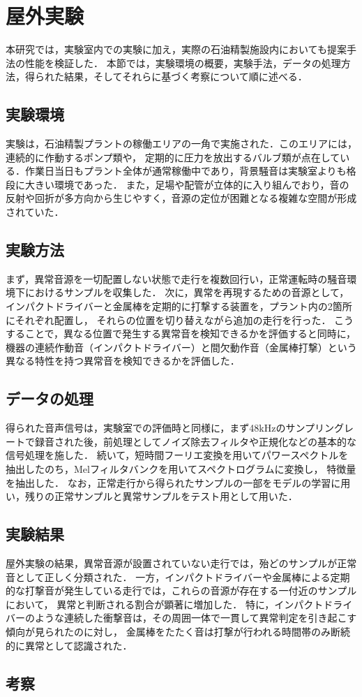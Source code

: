 \documentclass[../main]{subfiles}
\begin{document}
\section{屋外実験}
\label{sec:outdoor_experiment}
本研究では，実験室内での実験に加え，実際の石油精製施設内においても提案手法の性能を検証した．
本節では，実験環境の概要，実験手法，データの処理方法，得られた結果，そしてそれらに基づく考察について順に述べる．
\subsection{実験環境}
\label{subsec:vexp_ci_environment}
実験は，石油精製プラントの稼働エリアの一角で実施された．このエリアには，連続的に作動するポンプ類や，
定期的に圧力を放出するバルブ類が点在している．作業日当日もプラント全体が通常稼働中であり，背景騒音は実験室よりも格段に大きい環境であった．
また，足場や配管が立体的に入り組んでおり，音の反射や回折が多方向から生じやすく，音源の定位が困難となる複雑な空間が形成されていた．
\subsection{実験方法}
\label{subsec:vexp_ci_method}

まず，異常音源を一切配置しない状態で走行を複数回行い，正常運転時の騒音環境下におけるサンプルを収集した．
次に，異常を再現するための音源として，インパクトドライバーと金属棒を定期的に打撃する装置を，プラント内の2箇所にそれぞれ配置し，
それらの位置を切り替えながら追加の走行を行った．
こうすることで，異なる位置で発生する異常音を検知できるかを評価すると同時に，
機器の連続作動音（インパクトドライバー）と間欠動作音（金属棒打撃）という異なる特性を持つ異常音を検知できるかを評価した．
\subsection{データの処理}
\label{subsec:vexp_ci_processing}
得られた音声信号は，実験室での評価時と同様に，まず48kHzのサンプリングレートで録音された後，前処理としてノイズ除去フィルタや正規化などの基本的な信号処理を施した．
続いて，短時間フーリエ変換を用いてパワースペクトルを抽出したのち，Melフィルタバンクを用いてスペクトログラムに変換し，
特徴量を抽出した．
なお，正常走行から得られたサンプルの一部をモデルの学習に用い，残りの正常サンプルと異常サンプルをテスト用として用いた．

\subsection{実験結果}
\label{subsec:vexp_ci_result}
屋外実験の結果，異常音源が設置されていない走行では，殆どのサンプルが正常音として正しく分類された．
一方，インパクトドライバーや金属棒による定期的な打撃音が発生している走行では，これらの音源が存在する一付近のサンプルにおいて，
異常と判断される割合が顕著に増加した．
特に，インパクトドライバーのような連続した衝撃音は，その周囲一体で一貫して異常判定を引き起こす傾向が見られたのに対し，
金属棒をたたく音は打撃が行われる時間帯のみ断続的に異常として認識された．
\subsection{考察}
\end{document}
